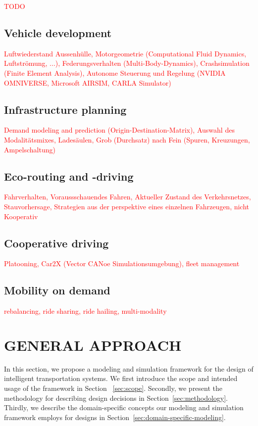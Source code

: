 \documentclass[a4paper,twoside]{article}
\begin{document}
	\textcolor{red}{TODO}

	\subsection{Vehicle development}

	\textcolor{red}{Luftwiederstand Aussenhülle, Motorgeometrie (Computational Fluid Dynamics, Luftströmung, ...), Federungsverhalten (Multi-Body-Dynamics), Crashsimulation (Finite Element Analysis), Autonome Steuerung und Regelung (NVIDIA OMNIVERSE, Microsoft AIRSIM, CARLA Simulator)}

	\subsection{Infrastructure planning}

	\textcolor{red}{Demand modeling and prediction (Origin-Destination-Matrix), Auswahl des Modalitätsmixes, Ladesäulen, Grob (Durchsatz) nach Fein (Spuren, Kreuzungen, Ampelschaltung)}

	\subsection{Eco-routing and -driving}

	\textcolor{red}{Fahrverhalten, Voraussschauendes Fahren, Aktueller Zustand des Verkehrsnetzes, Stauvorhersage, Strategien aus der perspektive eines einzelnen Fahrzeugen, nicht Kooperativ}

	\subsection{Cooperative driving}

	\textcolor{red}{Platooning, Car2X (Vector CANoe Simulationsumgebung), fleet management}

	\subsection{Mobility on demand}

	\textcolor{red}{rebalancing, ride sharing, ride hailing, multi-modality}
	
	\section{\uppercase{General approach}}
	\label{sec:approach}
	
	In this section, we propose a modeling and simulation framework for the design of intelligent transportation systems.
	We first introduce the scope and intended usage of the framework in Section ~\ref{sec:scope}.
	Secondly, we present the methodology for describing design decisions in Section~\ref{sec:methodology}.
	Thirdly, we describe the domain-specific concepts our modeling and simulation framework employs for designs in Section~\ref{sec:domain-specific-modeling}.
	
\end{document}
